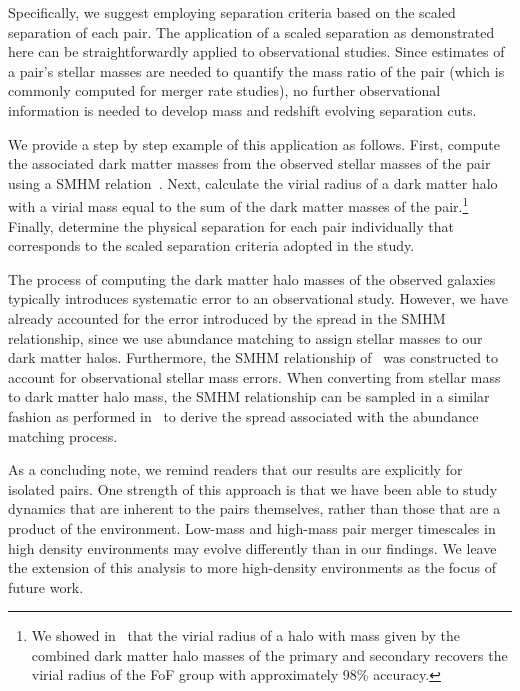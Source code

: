 \documentclass[twocolumn,linenumbers]{aastex631}
\newcommand{\chambe}{\citet{Chamberlain2024}}
\begin{document}
            Specifically, we suggest employing separation criteria based on the scaled separation of each pair. 
            The application of a scaled separation as demonstrated here can be straightforwardly applied to observational studies. 
            Since estimates of a pair's stellar masses are needed to quantify the mass ratio of the pair (which is commonly computed for merger rate studies), no further observational information is needed to develop mass and redshift evolving separation cuts. 
            
            We provide a step by step example of this application as follows. First, compute the associated dark matter masses from the observed stellar masses of the pair using a SMHM relation~\citep[in this study, we employ that of][]{Moster2013}.
            Next, calculate the virial radius of a dark matter halo with a virial mass equal to the sum of the dark matter masses of the pair.\footnote{We showed in~\chambe{} that the virial radius of a halo with mass given by the combined dark matter halo masses of the primary and secondary recovers the virial radius of the FoF group with approximately 98\% accuracy.}
            Finally, determine the physical separation for each pair individually that corresponds to the scaled separation criteria adopted in the study.

            The process of computing the dark matter halo masses of the observed galaxies typically introduces systematic error to an observational study.
            However, we have already accounted for the error introduced by the spread in the SMHM relationship, since we use abundance matching to assign stellar masses to our dark matter halos. Furthermore, the SMHM relationship of~\cite{Moster2013} was constructed to account for observational stellar mass errors.
            When converting from stellar mass to dark matter halo mass, the SMHM relationship can be sampled in a similar fashion as performed in~\chambe{} to derive the spread associated with the abundance matching process.
            
            As a concluding note, we remind readers that our results are explicitly for isolated pairs. 
            One strength of this approach is that we have been able to study dynamics that are inherent to the pairs themselves, rather than those that are a product of the environment. 
            Low-mass and high-mass pair merger timescales in high density environments may evolve differently than in our findings. 
            We leave the extension of this analysis to more high-density environments as the focus of future work. 
   
\end{document}
